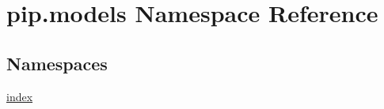 \hypertarget{namespacepip_1_1models}{}\section{pip.\+models Namespace Reference}
\label{namespacepip_1_1models}
\subsection*{Namespaces}
\begin{DoxyCompactItemize}
\item 
 \hyperlink{namespacepip_1_1models_1_1index}{index}
\end{DoxyCompactItemize}
